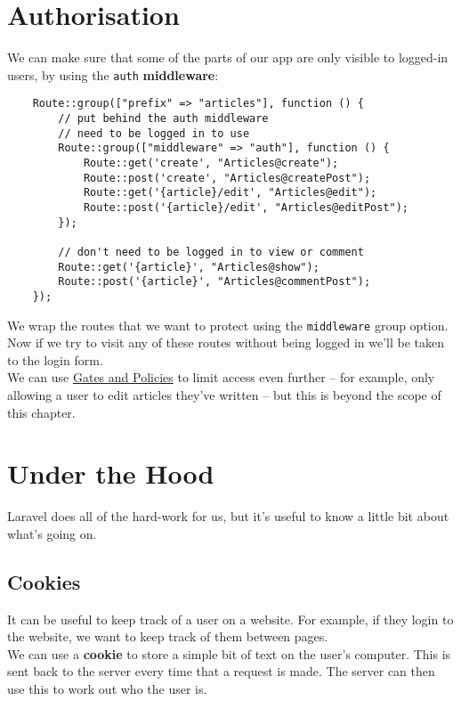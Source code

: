 \section{Authorisation}

We can make sure that some of the parts of our app are only visible to logged-in users, by using the \texttt{auth} \textbf{middleware}:

\begin{verbatim}
    Route::group(["prefix" => "articles"], function () {
        // put behind the auth middleware
        // need to be logged in to use
        Route::group(["middleware" => "auth"], function () {
            Route::get('create', "Articles@create");
            Route::post('create', "Articles@createPost");
            Route::get('{article}/edit', "Articles@edit");
            Route::post('{article}/edit', "Articles@editPost");
        });

        // don't need to be logged in to view or comment
        Route::get('{article}', "Articles@show");
        Route::post('{article}', "Articles@commentPost");
    });
\end{verbatim}

We wrap the routes that we want to protect using the \texttt{middleware} group option. Now if we try to visit any of these routes without being logged in we'll be taken to the login form.
\\

We can use \href{http://laravel.com/docs/master/authorization}{Gates and Policies} to limit access even further – for example, only allowing a user to edit articles they've written – but this is beyond the scope of this chapter.


\section{Under the Hood}

Laravel does all of the hard-work for us, but it's useful to know a little bit about what's going on.

\subsection{Cookies}

It can be useful to keep track of a user on a website. For example, if they login to the website, we want to keep track of them between pages.
\\

We can use a \textbf{cookie} to store a simple bit of text on the user's computer. This is sent back to the server every time that a request is made. The server can then use this to work out who the user is.

